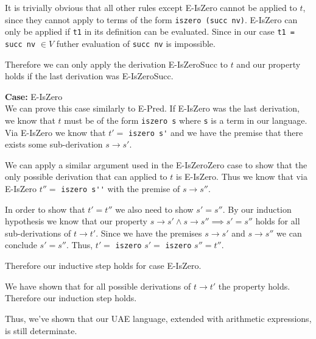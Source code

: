 \documentclass[12pt, fleqn]{article}
\begin{document}
\medskip
It is trivially obvious that all other rules except E-IsZero cannot be applied to $t$, since they cannot apply to
terms of the form \verb|iszero (succ nv)|. E-IsZero can only be applied if \verb|t1| in its definition can be evaluated. 
Since in our case \verb|t1 = succ nv| $\in V$ futher evaluation of \verb|succ nv| is impossible.

\medskip
Therefore we can only apply the derivation E-IsZeroSucc to $t$ and our property holds if the last derivation was E-IsZeroSucc.

\medskip
\textbf{Case:} E-IsZero\\
We can prove this case similarly to E-Pred.
If E-IsZero was the last derivation, we know that $t$ must be of the form \verb|iszero s| where \verb|s| is a term in our
language. Via E-IsZero we know that $t' = $ \verb|iszero s'| and we have the premise that there exists some sub-derivation $s \rightarrow s'$.

We can apply a similar argument used in the E-IsZeroZero case to show that the only possible derivation that can applied to $t$ is
E-IsZero. Thus we know that via E-IsZero $t'' =$ \verb|iszero s''| with the premise of $s \rightarrow s''$. 

In order to show that $t' = t''$ we also need to show $s' = s''$. By our induction hypothesis we know that our
property $s \rightarrow s' \land s \rightarrow s'' \implies s' = s''$ holds for all sub-derivations of $t \rightarrow t'$.
Since we have the premises $s \rightarrow s'$ and $s \rightarrow s''$ we can conclude $s' = s''$. 
Thus, $t' = $ \verb|iszero| $s' =$ \verb|iszero| $s'' = t''$.

Therefore our inductive step holds for case E-IsZero.

\medskip

We have shown that for all possible derivations of $t \rightarrow t'$ the property holds. 
Therefore our induction step holds.

\medskip

Thus, we've shown that our UAE language, extended with arithmetic expressions, is still determinate.
\end{document}
